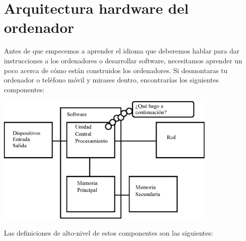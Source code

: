 \section{Arquitectura hardware del ordenador}

Antes de que empecemos a aprender el idioma que deberemos hablar
para dar instrucciones a los ordenadores o desarrollar
software, necesitamos aprender un poco acerca de cómo
están construidos los ordenadores. Si desmontaras
tu ordenador o teléfono móvil y mirases dentro,
encontrarías los siguientes componentes:

\beforefig
\centerline{\includegraphics[height=2.50in]{figs2/arch.eps}}
\afterfig

Las definiciones de alto-nivel de estos componentes son las siguientes:

